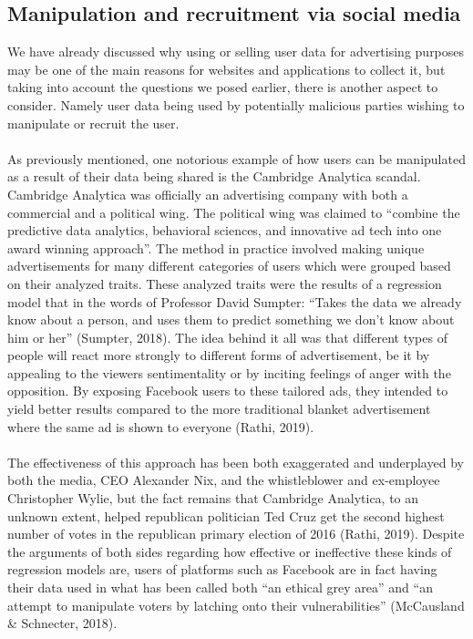 \documentclass[11pt]{article}
\begin{document}
\subsection{Manipulation and recruitment via social media}
We have already discussed why using or selling user data for advertising purposes may be one of the main reasons for websites and applications to collect it, but taking into account the questions we posed earlier, there is another aspect to consider. Namely user data being used by potentially malicious parties wishing to manipulate or recruit the user.
\\ \\ 
As previously mentioned, one notorious example of how users can be manipulated as a result of their data being shared is the Cambridge Analytica scandal. Cambridge Analytica was officially an advertising company with both a commercial and a political wing. The political wing was claimed to “combine the predictive data analytics, behavioral sciences, and innovative ad tech into one award winning approach”. The method in practice involved making unique advertisements for many different categories of users which were grouped based on their analyzed traits. These analyzed traits were the results of a regression model that in the words of Professor David Sumpter: “Takes the data we already know about a person, and uses them to predict something we don’t know about him or her” (Sumpter, 2018). The idea behind it all was that different types of people will react more strongly to different forms of advertisement, be it by appealing to the viewers sentimentality or by inciting feelings of anger with the opposition. By exposing Facebook users to these tailored ads, they intended to yield better results compared to the more traditional blanket advertisement where the same ad is shown to everyone (Rathi, 2019).  
\\ \\
The effectiveness of this approach has been both exaggerated and underplayed by both the media, CEO Alexander Nix, and the whistleblower and ex-employee Christopher Wylie, but the fact remains that Cambridge Analytica, to an unknown extent, helped republican politician Ted Cruz get the second highest number of votes in the republican primary election of 2016 (Rathi, 2019). Despite the arguments of both sides regarding how effective or ineffective these kinds of regression models are, users of platforms such as Facebook are in fact having their data used in what has been called both “an ethical grey area” and “an attempt to manipulate voters by latching onto their vulnerabilities” (McCausland \& Schnecter, 2018). 
\end{document}

